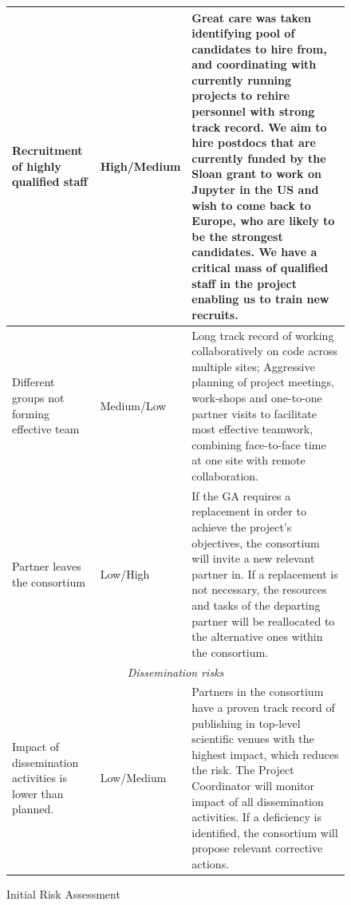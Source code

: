 \begin{figure}
\begin{center}
\begin{tabular}{|m{}|m{}|m{}|}
  Recruitment of highly qualified staff & High/Medium &
  Great care was taken identifying pool of candidates to hire from,
  and coordinating with currently running projects to rehire personnel
  with strong track record. We aim to hire
  postdocs that are currently funded by the Sloan grant to work on
  Jupyter in the US and wish to come back to Europe, who are
  likely to be the strongest candidates. We have a critical mass of
  qualified staff in the project enabling us to train new recruits. \\\hline

  Different groups not forming effective team & Medium/Low & Long
  track record of working collaboratively on code across multiple
  sites; Aggressive planning of project meetings, work-shops and
  one-to-one partner visits to facilitate most effective teamwork,
  combining face-to-face time at one site with remote
  collaboration.\\\hline

  Partner leaves the consortium & Low/High & If the GA requires a replacement
  in order to achieve the project's objectives, the consortium will invite a new
  relevant partner in. If a replacement is not necessary, the resources and tasks
  of the departing partner will be reallocated to the alternative ones within the
  consortium.
  \\\hline

  \multicolumn{3}{|c|}{
    \textit{Dissemination risks}
  }
  \\\hline

  Impact of dissemination activities is lower than planned. & Low/Medium &
  Partners in the consortium have a proven track record of publishing in top-level
  scientific venues with the highest impact, which reduces the risk. The Project Coordinator
  will monitor impact of all dissemination activities. If a deficiency is identified, the consortium
  will propose relevant corrective actions.\\\hline

  \end{tabular}
\end{center}
\caption{\label{risk-table}Initial Risk Assessment}
\end{figure}
\fi





